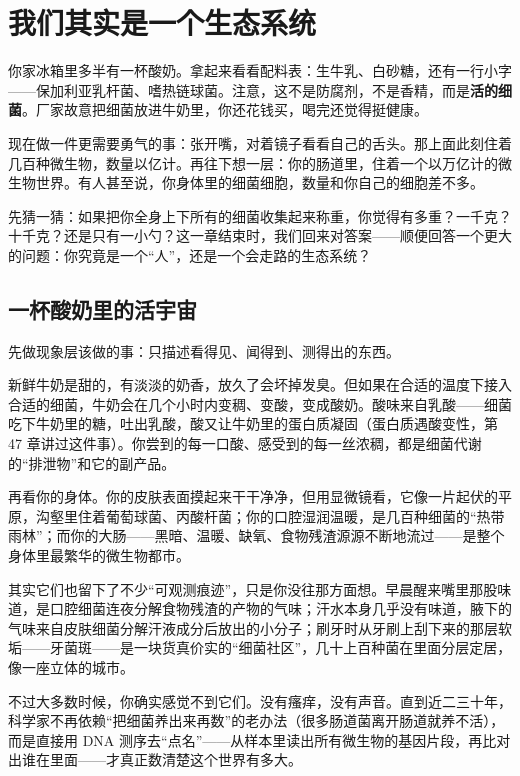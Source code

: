 \chapter{我们其实是一个生态系统}

\begin{kaichang}
你家冰箱里多半有一杯酸奶。拿起来看看配料表：生牛乳、白砂糖，还有一行小字——保加利亚乳杆菌、嗜热链球菌。注意，这不是防腐剂，不是香精，而是\textbf{活的细菌}。厂家故意把细菌放进牛奶里，你还花钱买，喝完还觉得挺健康。

现在做一件更需要勇气的事：张开嘴，对着镜子看看自己的舌头。那上面此刻住着几百种微生物，数量以亿计。再往下想一层：你的肠道里，住着一个以万亿计的微生物世界。有人甚至说，你身体里的细菌细胞，数量和你自己的细胞差不多。

先猜一猜：如果把你全身上下所有的细菌收集起来称重，你觉得有多重？一千克？十千克？还是只有一小勺？这一章结束时，我们回来对答案——顺便回答一个更大的问题：你究竟是一个“人”，还是一个会走路的生态系统？
\end{kaichang}

\section{一杯酸奶里的活宇宙}

先做现象层该做的事：只描述看得见、闻得到、测得出的东西。

新鲜牛奶是甜的，有淡淡的奶香，放久了会坏掉发臭。但如果在合适的温度下接入合适的细菌，牛奶会在几个小时内变稠、变酸，变成酸奶。酸味来自乳酸——细菌吃下牛奶里的糖，吐出乳酸，酸又让牛奶里的蛋白质凝固（蛋白质遇酸变性，第 47 章讲过这件事）。你尝到的每一口酸、感受到的每一丝浓稠，都是细菌代谢的“排泄物”和它的副产品。

再看你的身体。你的皮肤表面摸起来干干净净，但用显微镜看，它像一片起伏的平原，沟壑里住着葡萄球菌、丙酸杆菌；你的口腔湿润温暖，是几百种细菌的“热带雨林”；而你的大肠——黑暗、温暖、缺氧、食物残渣源源不断地流过——是整个身体里最繁华的微生物都市。

其实它们也留下了不少“可观测痕迹”，只是你没往那方面想。早晨醒来嘴里那股味道，是口腔细菌连夜分解食物残渣的产物的气味；汗水本身几乎没有味道，腋下的气味来自皮肤细菌分解汗液成分后放出的小分子；刷牙时从牙刷上刮下来的那层软垢——牙菌斑——是一块货真价实的“细菌社区”，几十上百种菌在里面分层定居，像一座立体的城市。

不过大多数时候，你确实感觉不到它们。没有瘙痒，没有声音。直到近二三十年，科学家不再依赖“把细菌养出来再数”的老办法（很多肠道菌离开肠道就养不活），而是直接用 DNA 测序去“点名”——从样本里读出所有微生物的基因片段，再比对出谁在里面——才真正数清楚这个世界有多大。

